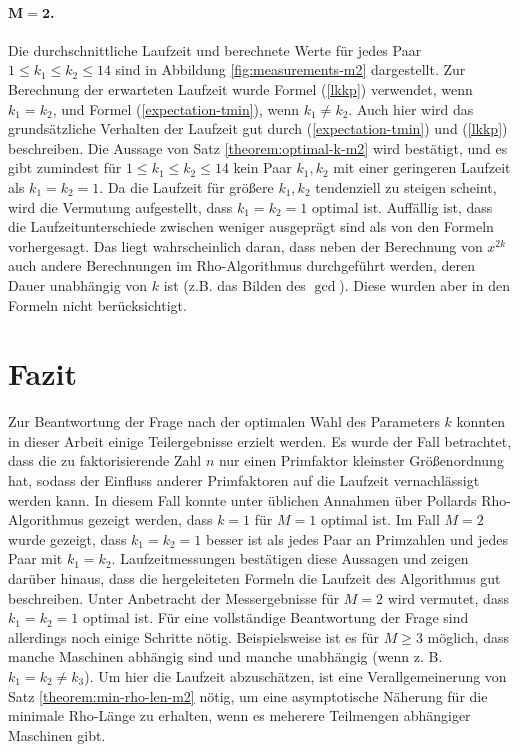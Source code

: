 \documentclass[a4paper, 10pt, ngerman]{article}
\begin{document}
    \paragraph{$\bm{M = 2}$.} Die durchschnittliche Laufzeit und berechnete Werte für jedes Paar $1 \le k_1 \le k_2 \le 14$ sind in Abbildung \ref{fig:measurements-m2} dargestellt. Zur Berechnung der erwarteten Laufzeit wurde Formel (\ref{lkkp}) verwendet, wenn $k_1 = k_2$, und Formel (\ref{expectation-tmin}), wenn $k_1 \ne k_2$. Auch hier wird das grundsätzliche Verhalten der Laufzeit gut durch (\ref{expectation-tmin}) und (\ref{lkkp}) beschreiben. Die Aussage von Satz \ref{theorem:optimal-k-m2} wird bestätigt, und es gibt zumindest für $1 \le k_1 \le k_2 \le 14$ kein Paar $k_1, k_2$ mit einer geringeren Laufzeit als $k_1 = k_2 = 1$. Da die Laufzeit für größere $k_1, k_2$ tendenziell zu steigen scheint, wird die Vermutung aufgestellt, dass $k_1 = k_2 = 1$ optimal ist. Auffällig ist, dass die Laufzeitunterschiede zwischen weniger ausgeprägt sind als von den Formeln vorhergesagt. Das liegt wahrscheinlich daran, dass neben der Berechnung von $x^{2k}$ auch andere Berechnungen im Rho-Algorithmus durchgeführt werden, deren Dauer unabhängig von $k$ ist (z.B. das Bilden des $\gcd$). Diese wurden aber in den Formeln nicht berücksichtigt.

    \begin{figure}

    \end{figure}

    \section{Fazit}

    Zur Beantwortung der Frage nach der optimalen Wahl des Parameters $k$ konnten in dieser Arbeit einige Teilergebnisse erzielt werden. Es wurde der Fall betrachtet, dass die zu faktorisierende Zahl $n$ nur einen Primfaktor kleinster Größenordnung hat, sodass der Einfluss anderer Primfaktoren auf die Laufzeit vernachlässigt werden kann. In diesem Fall konnte unter üblichen Annahmen über Pollards Rho-Algorithmus gezeigt werden, dass $k = 1$ für $M = 1$ optimal ist. Im Fall $M = 2$ wurde gezeigt, dass $k_1 = k_2 = 1$ besser ist als jedes Paar an Primzahlen und jedes Paar mit $k_1 = k_2$. Laufzeitmessungen bestätigen diese Aussagen und zeigen darüber hinaus, dass die hergeleiteten Formeln die Laufzeit des Algorithmus gut beschreiben. Unter Anbetracht der Messergebnisse für $M = 2$ wird vermutet, dass $k_1 = k_2 = 1$ optimal ist. Für eine vollständige Beantwortung der Frage sind allerdings noch einige Schritte nötig. Beispielsweise ist es für $M \ge 3$ möglich, dass manche Maschinen abhängig sind und manche unabhängig (wenn z. B. $k_1 = k_2 \ne k_3$). Um hier die Laufzeit abzuschätzen, ist eine Verallgemeinerung von Satz \ref{theorem:min-rho-len-m2} nötig, um eine asymptotische Näherung für die minimale Rho-Länge zu erhalten, wenn es meherere Teilmengen abhängiger Maschinen gibt.

\newpage
\printbibliography
\end{document}

